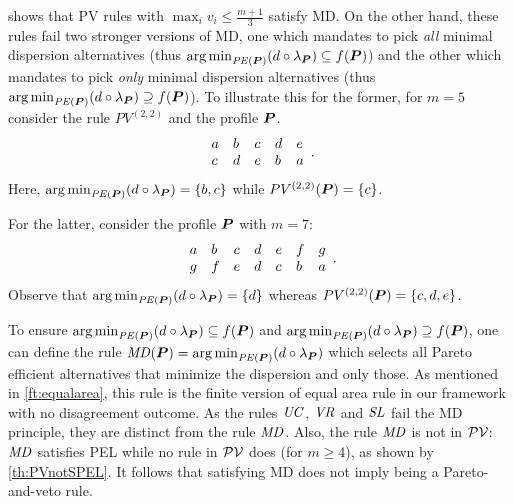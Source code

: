 \documentclass[pagesize, twoside=off, bibliography=totoc, DIV=calc, fontsize=12pt, a4paper]{scrartcl}
\begin{document}

\begin{remark}
	 shows that PV rules with $\max_i v_i ≤ \frac{m + 1}{3}$ satisfy MD. On the other hand, these rules fail two stronger versions of MD, one which mandates to pick \emph{all} minimal dispersion alternatives (thus $\argmin_{\PE} (d \circ \lprof) \subseteq f(\prof)$) and the other which mandates to pick \emph{only} minimal dispersion alternatives (thus $\argmin_{\PE} (d \circ \lprof) \supseteq f(\prof)$). To illustrate this for the former, for $m = 5$ consider the rule $PV^{(2, 2)}$ and the profile $\bm{P}$.
	\begin{equation}
		\begin{array}{*5{l}}
			a& b & c & d & e \\
			c& d & e & b & a\\
		\end{array}.
	\end{equation}
	Here, $\argmin_{\PE} (d \circ \lprof) = \set{b, c}$ while $PV^{(2, 2)}(\bm{P}) = \{c\}$.

For the latter, consider the profile $\bm{P}$ with $m=7$:
	\begin{equation}
		\begin{array}{*7{l}}
			a& b & c & d & e & f & g\\
			g& f & e & d & c& b & a \\
		\end{array}.
	\end{equation}
Observe that $\argmin_{\PE} (d \circ \lprof) = \set{d}$ whereas $PV^{(2, 2)}(\bm{P})=\{c,d,e\}$.
\end{remark}

\begin{remark}
	To ensure $\argmin_{\PE} (d \circ \lprof) \subseteq f(\prof)$ and $\argmin_{\PE} (d \circ \lprof) \supseteq f(\prof)$, one can define the rule $\MD(\prof) = \argmin_{\PE}(d \circ \lprof)$ which selects all Pareto efficient alternatives that minimize the dispersion and only those. As mentioned in \cref{ft:equalarea}, this rule is the finite version of  equal area rule in our framework with no disagreement outcome.
 As the rules $\mathit{UC}$, $\mathit{VR}$ and $\mathit{SL}$ fail the MD principle, they are distinct from the rule $\mathit{MD}$. Also, the rule $\mathit{MD}$ is not in $\mathcal{PV}$: $\mathit{MD}$ satisfies PEL while no rule in $\mathcal{PV}$ does (for $m ≥ 4$), as shown by \cref{th:PVnotSPEL}. It follows that satisfying MD does not imply being a Pareto-and-veto rule.
\end{remark}
\end{document}
